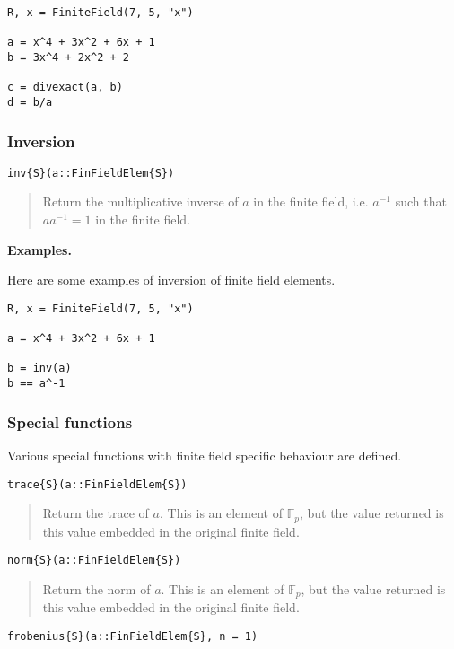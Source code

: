 \documentclass[a4paper,10pt]{article}
\newcommand{\F}{\mathbb{F}}
\newcommand{\desc}[1]{\vspace{-3mm}\begin{quote}#1\end{quote}}
\begin{document}
{{\begin{lstlisting}
R, x = FiniteField(7, 5, "x")

a = x^4 + 3x^2 + 6x + 1
b = 3x^4 + 2x^2 + 2

c = divexact(a, b)
d = b/a
\end{lstlisting}

\subsubsection{Inversion}

\begin{lstlisting}
inv{S}(a::FinFieldElem{S})
\end{lstlisting}

\desc{Return the multiplicative inverse of $a$ in the finite field, i.e. 
$a^{-1}$ such that $aa^{-1} = 1$ in the finite field.}

\textbf{Examples.}

Here are some examples of inversion of finite field elements.

\begin{lstlisting}
R, x = FiniteField(7, 5, "x")

a = x^4 + 3x^2 + 6x + 1

b = inv(a)
b == a^-1
\end{lstlisting}

\subsubsection{Special functions}

Various special functions with finite field specific behaviour are
defined.

\begin{lstlisting}
trace{S}(a::FinFieldElem{S})
\end{lstlisting}

\desc{Return the trace of $a$. This is an element of $\F_p$, but the value
returned is this value embedded in the original finite field.}

\begin{lstlisting}
norm{S}(a::FinFieldElem{S})
\end{lstlisting}

\desc{Return the norm of $a$. This is an element of $\F_p$, but the value
returned is this value embedded in the original finite field.}

\begin{lstlisting}
frobenius{S}(a::FinFieldElem{S}, n = 1)
\end{lstlisting}

}}
\end{document}
